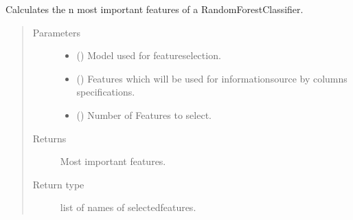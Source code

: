 \documentclass[letterpaper,10pt,english]{sphinxmanual}
\begin{document}
\begin{fulllineitems}
\label{\detokenize{anoog.model:anoog.model.model.get_most_important_features_as_list}}
\sphinxAtStartPar
Calculates the n most important features of a RandomForestClassifier.
\begin{quote}\begin{description}
\item[{Parameters}] \leavevmode\begin{itemize}
\item {} 
\sphinxAtStartPar
{} () \textendash{} Model used for feature\sphinxhyphen{}selection.

\item {} 
\sphinxAtStartPar
{} () \textendash{} Features which will be used for information\sphinxhyphen{}source by columns specifications.

\item {} 
\sphinxAtStartPar
{} () \textendash{} Number of Features to select.

\end{itemize}

\item[{Returns}] \leavevmode
\sphinxAtStartPar
Most important features.

\item[{Return type}] \leavevmode
\sphinxAtStartPar
list of names of selected\sphinxhyphen{}features.

\end{description}\end{quote}

\end{fulllineitems}

\end{document}
